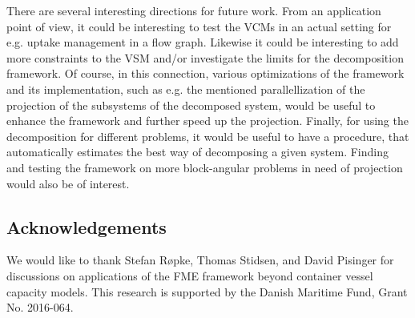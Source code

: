 \documentclass{llncs}
\begin{document}
There are several interesting directions for future work. 
From an application point of view, it could be interesting to test the VCMs in an actual setting for e.g. uptake management in a flow graph.
Likewise it could be interesting to  add more constraints to the VSM and/or investigate the limits for the decomposition framework. Of course, in this connection, various optimizations of the framework and its implementation, such as e.g. the mentioned parallellization of the projection of the subsystems of the decomposed system, would be useful to enhance the framework and further speed up the projection. Finally, for using the decomposition for different problems, it would be useful to have a procedure, that automatically estimates the best way of decomposing a given system. Finding and testing the framework on more block-angular problems in need of projection would also be of interest.

\subsection*{Acknowledgements}
\small We would like to thank Stefan R{\o}pke, Thomas Stidsen, and David Pisinger for discussions on applications of the FME framework beyond container vessel capacity models. This research is supported by the Danish Maritime Fund, Grant No. 2016-064.



\end{document}
